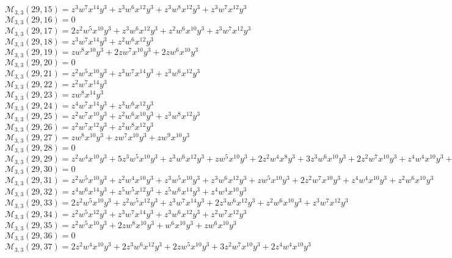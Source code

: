 $\mathcal{M}_{3,3}(29,15)=z^3w^7x^{14}y^3+z^3w^6x^{12}y^3+z^3w^8x^{12}y^3+z^3w^7x^{12}y^3$\\
$\mathcal{M}_{3,3}(29,16)=0$\\
$\mathcal{M}_{3,3}(29,17)=2z^2w^5x^{10}y^3+z^3w^6x^{12}y^3+z^2w^6x^{10}y^3+z^3w^7x^{12}y^3$\\
$\mathcal{M}_{3,3}(29,18)=z^3w^7x^{14}y^3+z^2w^6x^{12}y^3$\\
$\mathcal{M}_{3,3}(29,19)=zw^8x^{10}y^3+2zw^7x^{10}y^3+2zw^6x^{10}y^3$\\
$\mathcal{M}_{3,3}(29,20)=0$\\
$\mathcal{M}_{3,3}(29,21)=z^2w^5x^{10}y^3+z^3w^7x^{14}y^3+z^3w^6x^{12}y^3$\\
$\mathcal{M}_{3,3}(29,22)=z^2w^7x^{14}y^3$\\
$\mathcal{M}_{3,3}(29,23)=zw^8x^{14}y^3$\\
$\mathcal{M}_{3,3}(29,24)=z^4w^7x^{14}y^3+z^3w^6x^{12}y^3$\\
$\mathcal{M}_{3,3}(29,25)=z^2w^7x^{10}y^3+z^2w^6x^{10}y^3+z^3w^8x^{12}y^3$\\
$\mathcal{M}_{3,3}(29,26)=z^2w^7x^{12}y^3+z^2w^8x^{12}y^3$\\
$\mathcal{M}_{3,3}(29,27)=zw^8x^{10}y^3+zw^7x^{10}y^3+zw^9x^{10}y^3$\\
$\mathcal{M}_{3,3}(29,28)=0$\\
$\mathcal{M}_{3,3}(29,29)=z^2w^4x^{10}y^3+5z^3w^5x^{10}y^3+z^3w^6x^{12}y^3+zw^5x^{10}y^3+2z^2w^4x^8y^3+3z^3w^6x^{10}y^3+2z^2w^7x^{10}y^3+z^4w^4x^{10}y^3+z^2w^5x^8y^3$\\
$\mathcal{M}_{3,3}(29,30)=0$\\
$\mathcal{M}_{3,3}(29,31)=z^2w^5x^{10}y^3+z^2w^4x^{10}y^3+z^3w^5x^{10}y^3+z^3w^6x^{12}y^3+zw^5x^{10}y^3+2z^2w^7x^{10}y^3+z^4w^4x^{10}y^3+z^2w^6x^{10}y^3$\\
$\mathcal{M}_{3,3}(29,32)=z^4w^6x^{14}y^3+z^5w^5x^{12}y^3+z^5w^6x^{14}y^3+z^4w^4x^{10}y^3$\\
$\mathcal{M}_{3,3}(29,33)=2z^2w^5x^{10}y^3+z^2w^5x^{12}y^3+z^3w^7x^{14}y^3+2z^3w^6x^{12}y^3+z^2w^6x^{10}y^3+z^3w^7x^{12}y^3$\\
$\mathcal{M}_{3,3}(29,34)=z^2w^5x^{12}y^3+z^3w^7x^{14}y^3+z^3w^6x^{12}y^3+z^2w^7x^{12}y^3$\\
$\mathcal{M}_{3,3}(29,35)=z^2w^5x^{10}y^3+2zw^8x^{10}y^3+w^6x^{10}y^3+zw^6x^{10}y^3$\\
$\mathcal{M}_{3,3}(29,36)=0$\\
$\mathcal{M}_{3,3}(29,37)=2z^2w^4x^{10}y^3+2z^3w^6x^{12}y^3+2zw^5x^{10}y^3+3z^2w^7x^{10}y^3+2z^4w^4x^{10}y^3$\\
